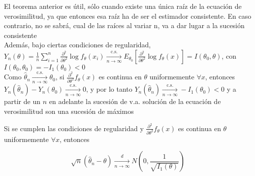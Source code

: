 \begin{observación}
El teorema anterior es útil, sólo cuando existe una única raíz de la ecuación de verosimilitud, ya que entonces esa raíz ha de ser el estimador consistente. En caso contrario, no se sabrá, cual de las raíces al variar n, va a dar lugar a la sucesión consistente\\
Además, bajo ciertas condiciones de regularidad,\\
$Y_{n}(\theta)=\frac{1}{n} \sum_{i=1}^{n} \frac{\partial^{2}}{\partial \theta^{2}} \log f_{\theta}\left(x_{i}\right) \xrightarrow[n \rightarrow \infty]{\text { c.s. }} E_{\theta_{0}}\left[\frac{\partial^{2}}{\partial \theta^{2}} \log f_{\theta}(x)\right]=I\left(\theta_{0}, \theta\right)$, con $I\left(\theta_{0}, \theta_{0}\right)=-I_{1}\left(\theta_{0}\right)<0$\\
Como $\hat{\theta}_{n} \xrightarrow[n \rightarrow \infty]{\text { c.s. }} \theta_{0}$, si $\frac{\partial^{2}}{\partial \theta^{2}} f_{\theta}(x)$ es continua en $\theta$ uniformemente $\forall x$, entonces $Y_{n}\left(\hat{\theta}_{n}\right)-Y_{n}\left(\theta_{0}\right) \xrightarrow[n \rightarrow \infty]{\text { c.s. }} 0$, y por lo tanto $Y_{n}\left(\hat{\theta}_{n}\right) \xrightarrow[n \rightarrow \infty]{\text { c.s. }}-I_{1}\left(\theta_{0}\right)<0$ y a partir de un $n$ en adelante la sucesión de v.a. solución de la ecuación de verosimilitud son una sucesión de máximos  
\end{observación}



\begin{teorema} 
  Si se cumplen las condiciones de regularidad y $\frac{\partial^{2}}{\partial \theta^{2}} f_{\theta}(x)$ es continua en $\theta$ uniformemente $\forall x$, entonces

  $$
    \sqrt{n}\left(\hat{\theta}_{n}-\theta\right) \underset{n \rightarrow \infty}{\stackrel{d}{\longrightarrow}} N\left(0, \frac{1}{\sqrt{I_{1}(\theta)}}\right)
  $$

\end{teorema}

